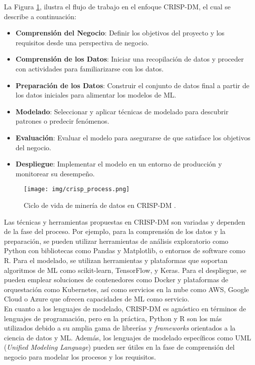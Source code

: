 \documentclass[journal]{IEEEtran}
\begin{document}
La Figura \ref{fig:cripsDM}, ilustra el flujo de trabajo en el enfoque CRISP-DM, el cual se describe a continuación:\\

\begin{itemize}
    \item \textbf{Comprensión del Negocio}: Definir los objetivos del proyecto y los requisitos desde una perspectiva de negocio.
    \item \textbf{Comprensión de los Datos}: Iniciar una recopilación de datos y proceder con actividades para familiarizarse con los datos.
    \item \textbf{Preparación de los Datos}: Construir el conjunto de datos final a partir de los datos iniciales para alimentar los modelos de ML.
    \item \textbf{Modelado}: Seleccionar y aplicar técnicas de modelado para descubrir patrones o predecir fenómenos.
    \item \textbf{Evaluación}: Evaluar el modelo para asegurarse de que satisface los objetivos del negocio.
    \item \textbf{Despliegue}: Implementar el modelo en un entorno de producción y monitorear su desempeño.\\
\end{itemize}

\begin{figure}[h!]
    \centering
    \texttt{[image: img/crisp\_process.png]}
    \caption{Ciclo de vida de minería de datos en CRISP-DM \cite{ibmConceptosBxE1sicos}.}
    \label{fig:cripsDM}
\end{figure}

Las técnicas y herramientas propuestas en CRISP-DM son variadas y dependen de la fase del proceso. Por ejemplo, para la comprensión de los datos y la preparación, se pueden utilizar herramientas de análisis exploratorio como Python con bibliotecas como Pandas y Matplotlib, o entornos de software como R. Para el modelado, se utilizan herramientas y plataformas que soportan algoritmos de ML como scikit-learn, TensorFlow, y Keras. Para el despliegue, se pueden emplear soluciones de contenedores como Docker y plataformas de orquestación como Kubernetes, así como servicios en la nube como AWS, Google Cloud o Azure que ofrecen capacidades de ML como servicio.\\

En cuanto a los lenguajes de modelado, CRISP-DM es agnóstico en términos de lenguajes de programación, pero en la práctica, Python y R son los más utilizados debido a su amplia gama de librerías y \textit{frameworks} orientados a la ciencia de datos y ML. Además, los lenguajes de modelado específicos como UML (\textit{Unified Modeling Language}) pueden ser útiles en la fase de comprensión del negocio para modelar los procesos y los requisitos.\\
\end{document}
